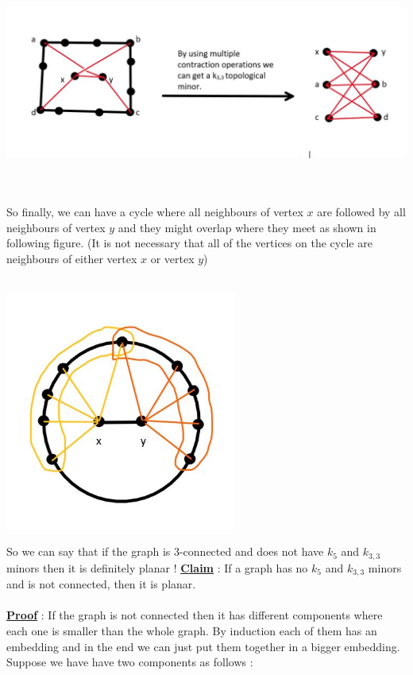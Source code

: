 \documentclass{article}
\begin{document}
    \\\\
    \centerline{\includegraphics[width=6in]{Images/k3,3.jpg}}
    \\\\
    So finally, we can have a cycle where all neighbours of vertex $x$ are followed by all neighbours of vertex $y$ and they might overlap where they meet as shown in following figure. (It is not necessary that all of the vertices on the cycle are neighbours of either vertex $x$ or vertex $y$)
    \\\\
    \centerline{\includegraphics[width=3in]{Images/final_lemma_2.JPG}}
    So we can say that if the graph is 3-connected and does not have $k_{5}$ and $k_{3,3}$ minors then it is definitely planar !
    \newpage
    \underline{\textbf{Claim}} : If a graph has no $k_{5}$ and $k_{3,3}$ minors and is not connected, then it is planar. 
    \\\\
    \underline{\textbf{Proof}} : 
    If the graph is not connected then it has different components where each one is smaller than the whole graph. By induction each of them has an embedding and in the end we can just put them together in a bigger embedding. Suppose we have have two components as follows :
\end{document}
